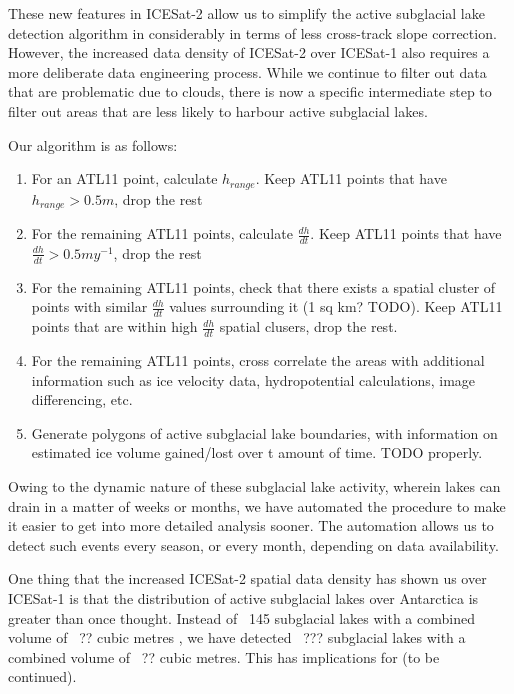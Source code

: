 These new features in ICESat-2 allow us to simplify the active subglacial lake detection algorithm in \citep{Smithinventoryactivesubglacial2009} considerably in terms of less cross-track slope correction.
However, the increased data density of ICESat-2 over ICESat-1 also requires a more deliberate data engineering process.
While we continue to filter out data that are problematic due to clouds, there is now a specific intermediate step to filter out areas that are less likely to harbour active subglacial lakes.

Our algorithm is as follows:

\begin{enumerate}
  \item For an ATL11 point, calculate $h_{range}$. Keep ATL11 points that have $h_{range} > 0.5 m$, drop the rest
  \item For the remaining ATL11 points, calculate $\frac{dh}{dt}$. Keep ATL11 points that have $\frac{dh}{dt} > 0.5 m y^{-1}$, drop the rest
  \item For the remaining ATL11 points, check that there exists a spatial cluster of points with similar $\frac{dh}{dt}$ values surrounding it (1 sq km? TODO). Keep ATL11 points that are within high $\frac{dh}{dt}$ spatial clusers, drop the rest.
  \item For the remaining ATL11 points, cross correlate the areas with additional information such as ice velocity data, hydropotential calculations, image differencing, etc.
  \item Generate polygons of active subglacial lake boundaries, with information on estimated ice volume gained/lost over \gls{t} amount of time. TODO properly.
\end{enumerate}

Owing to the dynamic nature of these subglacial lake activity, wherein lakes can drain in a matter of weeks or months, we have automated the procedure to make it easier to get into more detailed analysis sooner.
The automation allows us to detect such events every season, or every month, depending on data availability.

One thing that the increased ICESat-2 spatial data density has shown us over ICESat-1 is that the distribution of active subglacial lakes over Antarctica is greater than once thought.
Instead of ~145 subglacial lakes with a combined volume of ~?? cubic metres \citep{Smithinventoryactivesubglacial2009}, we have detected ~??? subglacial lakes with a combined volume of ~?? cubic metres.
This has implications for (to be continued).
